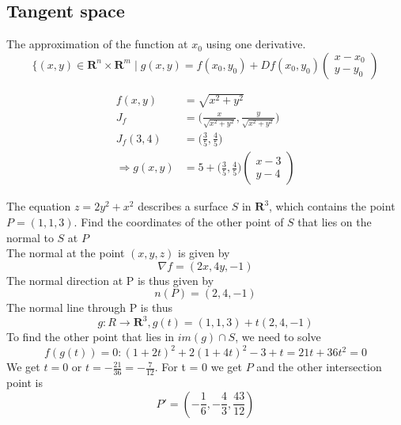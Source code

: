 \documentclass[8pt]{extarticle}
\newcommand{\R}{{\mathbb R}}
\def\R{\mathbf{R}}
\def\BoxStart{\begin{tcolorbox}[colback=blue!5!white,colframe=blue!75!black]}
\def\BoxEnd{\end{tcolorbox}}
\begin{document}
\begin{multicols*}{3}
  \subsection{Tangent space}
  The approximation of the function at $x_0$ using one derivative.
  $$\{(x, y) \in \R^n \times \R^m \;|\; g(x, y) = f(x_0, y_0) + Df(x_0, y_0)
	\begin{pmatrix} x - x_0 \\
			     y - y_0
	\end{pmatrix}$$
\BoxStart
  \begin{align*}
    f(x, y)             & = \sqrt{x^2 + y^2}                                                   \\
    J_f                 & = \Big( \frac{x}{\sqrt{x^2 + y^2}}, \frac{y}{\sqrt{x^2 + y^2}} \Big) \\
    J_f(3, 4)           & = \Big(\frac{3}{5}, \frac{4}{5}\Big)                                       \\
    \Rightarrow g(x, y) & = 5 + \Big(\frac{3}{5}, \frac{4}{5} \Big)\begin{pmatrix}
      x-3 \\
      y-4
    \end{pmatrix}
  \end{align*}
\BoxEnd
\BoxStart
The equation $z = 2y^2 + x^2$ describes a surface $S$ in $\R^3$, which contains the point $P = (1, 1, 3)$. Find the coordinates of the other point of $S$ that lies on the normal to $S$ at $P$ \\

The normal at the point $(x, y, z)$ is given by $$\nabla f = (2x, 4y, -1)$$
The normal direction at P is thus given by $$n(P) = (2, 4, -1)$$ The normal line through P is thus $$g : R \rightarrow \R^3, g(t) = (1, 1, 3) + t(2, 4, -1)$$
To find the other point that lies in $im(g) \cap S$, we need to solve $$f(g(t)) = 0: (1 + 2t)^2 + 2(1 + 4t)^2 - 3 + t = 21t + 36t^2 = 0$$
We get $t = 0$ or $t = -\frac{21}{36} = -\frac{7}{12}$. For t = 0 we get $P$ and the other intersection point is $$P' = \left(-\frac{1}{6}, -\frac{4}{3}, \frac{43}{12}\right)$$
\BoxEnd


\end{multicols*}
\end{document}
